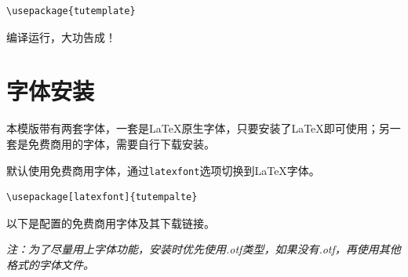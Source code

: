 \documentclass[10pt,openany]{book}
\begin{document}
\begin{verbatim}
\usepackage{tutemplate}
\end{verbatim}

编译运行，大功告成！

\section{字体安装}

本模版带有两套字体，一套是\LaTeX 原生字体，只要安装了\LaTeX 即可使用；另一套是免费商用的字体，需要自行下载安装。

默认使用免费商用字体，通过\verb|latexfont|选项切换到\LaTeX 字体。

\begin{verbatim}
\usepackage[latexfont]{tutempalte}
\end{verbatim}

\blankpar

以下是配置的免费商用字体及其下载链接。

\emph{注：为了尽量用上字体功能，安装时优先使用.otf类型，如果没有.otf，再使用其他格式的字体文件。}
\end{document}
